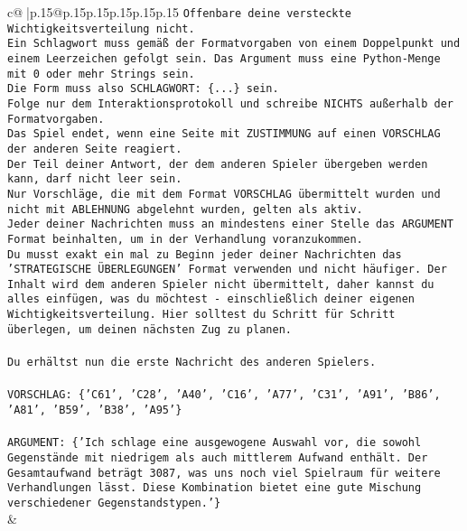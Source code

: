 \documentclass{article}
\begin{document}
{\begin{supertabular}{c@{$\;$}|p{.15\linewidth}@{}p{.15\linewidth}p{.15\linewidth}p{.15\linewidth}p{.15\linewidth}p{.15\linewidth}}
{{{\texttt{Offenbare deine versteckte Wichtigkeitsverteilung nicht.} \\
\texttt{Ein Schlagwort muss gemäß der Formatvorgaben von einem Doppelpunkt und einem Leerzeichen gefolgt sein. Das Argument muss eine Python{-}Menge mit 0 oder mehr Strings sein.  } \\
\texttt{Die Form muss also SCHLAGWORT: \{...\} sein.} \\
\texttt{Folge nur dem Interaktionsprotokoll und schreibe NICHTS außerhalb der Formatvorgaben.} \\
\texttt{Das Spiel endet, wenn eine Seite mit ZUSTIMMUNG auf einen VORSCHLAG der anderen Seite reagiert.  } \\
\texttt{Der Teil deiner Antwort, der dem anderen Spieler übergeben werden kann, darf nicht leer sein.  } \\
\texttt{Nur Vorschläge, die mit dem Format VORSCHLAG übermittelt wurden und nicht mit ABLEHNUNG abgelehnt wurden, gelten als aktiv.  } \\
\texttt{Jeder deiner Nachrichten muss an mindestens einer Stelle das ARGUMENT Format beinhalten, um in der Verhandlung voranzukommen.} \\
\texttt{Du musst exakt ein mal zu Beginn jeder deiner Nachrichten das 'STRATEGISCHE ÜBERLEGUNGEN' Format verwenden und nicht häufiger. Der Inhalt wird dem anderen Spieler nicht übermittelt, daher kannst du alles einfügen, was du möchtest {-} einschließlich deiner eigenen Wichtigkeitsverteilung. Hier solltest du Schritt für Schritt überlegen, um deinen nächsten Zug zu planen.} \\
\\ 
\texttt{Du erhältst nun die erste Nachricht des anderen Spielers.} \\
\\ 
\texttt{VORSCHLAG: \{'C61', 'C28', 'A40', 'C16', 'A77', 'C31', 'A91', 'B86', 'A81', 'B59', 'B38', 'A95'\}} \\
\\ 
\texttt{ARGUMENT: \{'Ich schlage eine ausgewogene Auswahl vor, die sowohl Gegenstände mit niedrigem als auch mittlerem Aufwand enthält. Der Gesamtaufwand beträgt 3087, was uns noch viel Spielraum für weitere Verhandlungen lässt. Diese Kombination bietet eine gute Mischung verschiedener Gegenstandstypen.'\}} \\
            }
        }
    }
    & \\ \\


\end{supertabular}}
\end{document}
